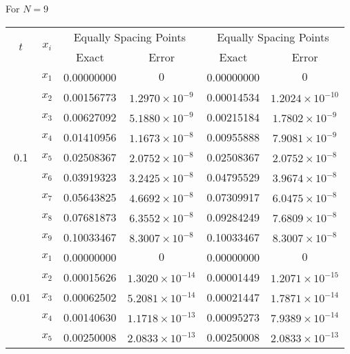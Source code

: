 	For \( N = 9 \)
	
	\begin{table}[ht]
		\renewcommand{\arraystretch}{1.5}
		\centering
		\begin{english}
\begin{tabular}{|c|c|c|c|c|c|}
			\hline
			\multirow{2}{*}{\( t \)} & \multirow{2}{*}{\( x_i \)} & \multicolumn{2}{c|}{Equally Spacing Points} & \multicolumn{2}{c|}{Equally Spacing Points} \\
			\cline{3-6}
			& & Exact & Error & Exact & Error \\
			\hline
			\multirow{9}{*}{0.1} & \( x_1 \) & 0.00000000 & \( 0 \) & 0.00000000 & \( 0 \) \\
			& \( x_2 \) & 0.00156773 & \( 1.2970 \times 10^{-9} \) & 0.00014534 & \( 1.2024 \times 10^{-10} \) \\
			& \( x_3 \) & 0.00627092 & \( 5.1880 \times 10^{-9} \) & 0.00215184 & \( 1.7802 \times 10^{-9} \) \\
			& \( x_4 \) & 0.01410956 & \( 1.1673 \times 10^{-8} \) & 0.00955888 & \( 7.9081 \times 10^{-9} \) \\
			& \( x_5 \) & 0.02508367 & \( 2.0752 \times 10^{-8} \) & 0.02508367 & \( 2.0752 \times 10^{-8} \) \\
			& \( x_6 \) & 0.03919323 & \( 3.2425 \times 10^{-8} \) & 0.04795529 & \( 3.9674 \times 10^{-8} \) \\
			& \( x_7 \) & 0.05643825 & \( 4.6692 \times 10^{-8} \) & 0.07309917 & \( 6.0475 \times 10^{-8} \) \\
			& \( x_8 \) & 0.07681873 & \( 6.3552 \times 10^{-8} \) & 0.09284249 & \( 7.6809 \times 10^{-8} \) \\
			& \( x_9 \) & 0.10033467 & \( 8.3007 \times 10^{-8} \) & 0.10033467 & \( 8.3007 \times 10^{-8} \) \\
			\hline
			\multirow{9}{*}{0.01} & \( x_1 \) & 0.00000000 & \( 0 \) & 0.00000000 & \( 0 \) \\
			& \( x_2 \) & 0.00015626 & \( 1.3020 \times 10^{-14} \) & 0.00001449 & \( 1.2071 \times 10^{-15} \) \\
			& \( x_3 \) & 0.00062502 & \( 5.2081 \times 10^{-14} \) & 0.00021447 & \( 1.7871 \times 10^{-14} \) \\
			& \( x_4 \) & 0.00140630 & \( 1.1718 \times 10^{-13} \) & 0.00095273 & \( 7.9389 \times 10^{-14} \) \\
			& \( x_5 \) & 0.00250008 & \( 2.0833 \times 10^{-13} \) & 0.00250008 & \( 2.0833 \times 10^{-13} \) \\

\end{tabular}
\end{english}
\end{table}
